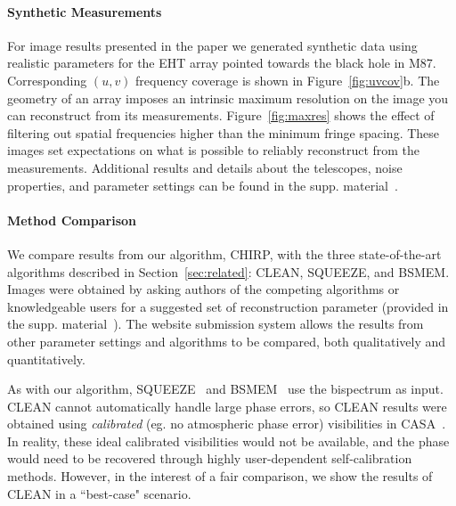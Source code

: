\paragraph{Synthetic Measurements}
For image results presented in the paper we generated synthetic data using realistic parameters for the EHT array pointed towards the black hole in M87.
Corresponding $(u,v)$ frequency coverage is shown in Figure~\ref{fig:uvcov}b.
The geometry of an array imposes an intrinsic maximum resolution on the image you can reconstruct from its measurements. Figure~\ref{fig:maxres} shows the effect of filtering out spatial frequencies higher than the minimum fringe spacing.
These images set expectations on what is possible to reliably reconstruct from the measurements.
Additional results and details about the telescopes, noise properties, and parameter settings can be found in the supp. material~\cite{suppmaterial}. 

\paragraph{Method Comparison} We compare results from our algorithm, CHIRP, with the three state-of-the-art algorithms described in Section~\ref{sec:related}: CLEAN, SQUEEZE, and BSMEM. 
Images were obtained by asking authors of the competing algorithms or knowledgeable users for a suggested set of reconstruction parameter (provided in the supp. material~\cite{suppmaterial}). 
The website submission system allows the results from other parameter settings and
algorithms to be compared, both qualitatively and quantitatively.


As with our algorithm, SQUEEZE~\cite{baron2010novel} and BSMEM~\cite{buscher1994direct} use the bispectrum as input. 
CLEAN cannot automatically handle large phase errors, so CLEAN results were obtained using {\it calibrated} (eg. no atmospheric phase error) visibilities in CASA~\cite{jaeger2008common}. In reality, these ideal calibrated visibilities would not be available, and the phase would need to be recovered through highly user-dependent self-calibration methods. However, in the interest of a fair comparison, we show the results of CLEAN in a ``best-case" scenario. 

